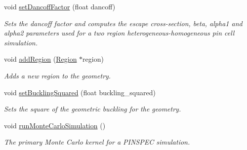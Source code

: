 \begin{DoxyCompactItemize}
void \hyperlink{classGeometry_a0ef3fcbefaf7079ee1667adc3d0dbe54}{set\-Dancoff\-Factor} (float dancoff)
\begin{DoxyCompactList}\small\item\em Sets the dancoff factor and computes the escape cross-\/section, beta, alpha1 and alpha2 parameters used for a two region heterogeneous-\/homogeneous pin cell simulation. \end{DoxyCompactList}\item 
void \hyperlink{classGeometry_a68b1626c22c75914eafdcee252406b62}{add\-Region} (\hyperlink{classRegion}{Region} $\ast$region)
\begin{DoxyCompactList}\small\item\em Adds a new region to the geometry. \end{DoxyCompactList}\item 
void \hyperlink{classGeometry_a81f067e09349731a0b90bdda98b83594}{set\-Buckling\-Squared} (float buckling\-\_\-squared)
\begin{DoxyCompactList}\small\item\em Sets the square of the geometric buckling for the geometry. \end{DoxyCompactList}\item 
void \hyperlink{classGeometry_a32ac1087eeb0f71d4f36b751e65cfe9d}{run\-Monte\-Carlo\-Simulation} ()
\begin{DoxyCompactList}\small\item\em The primary Monte Carlo kernel for a P\-I\-N\-S\-P\-E\-C simulation. \end{DoxyCompactList}\end{DoxyCompactItemize}
